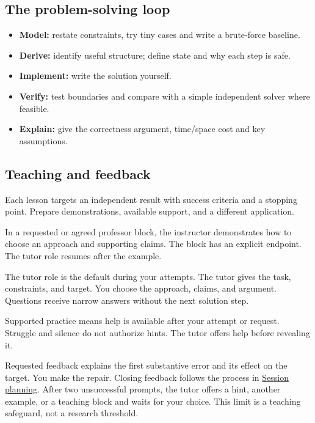 \documentclass[11pt,letterpaper]{article}
\begin{document}
\subsection*{The problem-solving loop}

\begin{itemize}

\item \textbf{Model:} restate constraints, try tiny cases and write a brute-force baseline.

\item \textbf{Derive:} identify useful structure; define state and why each step is safe.

\item \textbf{Implement:} write the solution yourself.

\item \textbf{Verify:} test boundaries and compare with a simple independent solver where feasible.

\item \textbf{Explain:} give the correctness argument, time/space cost and key assumptions.

\end{itemize}

\subsection*{Teaching and feedback}

Each lesson targets an independent result with success criteria and a stopping point. Prepare demonstrations, available support, and a different application.

In a requested or agreed professor block, the instructor demonstrates how to choose an approach and supporting claims. The block has an explicit endpoint. The tutor role resumes after the example.

The tutor role is the default during your attempts. The tutor gives the task, constraints, and target. You choose the approach, claims, and argument. Questions receive narrow answers without the next solution step.

Supported practice means help is available after your attempt or request. Struggle and silence do not authorize hints. The tutor offers help before revealing it.

Requested feedback explains the first substantive error and its effect on the target. You make the repair. Closing feedback follows the process in \hyperref[sec:25]{Session planning}. After two unsuccessful prompts, the tutor offers a hint, another example, or a teaching block and waits for your choice. This limit is a teaching safeguard, not a research threshold.
\end{document}
